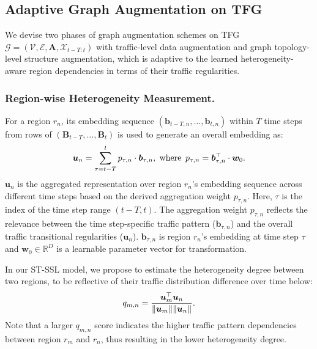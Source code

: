 \documentclass[letterpaper]{article} \usepackage{aaai23}  \usepackage{times}  \usepackage{helvet}  \usepackage{courier}  \usepackage[hyphens]{url}  \usepackage{graphicx} \urlstyle{rm} \def\UrlFont{\rm}  \usepackage{natbib}  \usepackage{caption} \frenchspacing  \setlength{\pdfpagewidth}{8.5in} \setlength{\pdfpageheight}{11in}
\newcommand{\name}{ST-SSL\xspace}
\DeclareMathOperator{\wh}{where}
\begin{document}
\subsection{Adaptive Graph Augmentation on TFG}



We devise two phases of graph augmentation schemes on TFG $\mathcal{G} = \left(\mathcal{V}, \mathcal{E}, \bm A, \mathcal{X}_{t-T:t}\right)$ with traffic-level data augmentation and graph topology-level structure augmentation, which is adaptive to the learned heterogeneity-aware region dependencies in terms of their traffic regularities.

\subsubsection{Region-wise Heterogeneity Measurement.} 
For a region $r_n$, its embedding sequence $(\bm{b}_{t-T, n}, \dots, \bm{b}_{t, n})$ within $T$ time steps from rows of $\left(\bm{B}_{t-T}, \dots, \bm{B}_{t}\right)$ is used to generate an overall embedding as:
\begin{equation}\small\label{eq:ta}
    \bm u_n = \sum_{\tau = t-T}^{t} p_{\tau,n}\cdot \bm b_{\tau,n},~\wh~ p_{\tau,n} = \bm b_{\tau,n}^\top \cdot \bm w_0.
\end{equation}
\noindent $\bm u_n$ is the aggregated representation over region $r_n$'s embedding sequence across different time steps based on the derived aggregation weight $p_{\tau,n}$. Here, $\tau$ is the index of the time step range $(t-T, t)$. The aggregation weight $p_{\tau,n}$ reflects the relevance between the time step-specific traffic pattern ($\bm b_{\tau,n}$) and the overall traffic transitional regularities ($\bm u_n$). $\bm b_{\tau,n}$ is region $r_n$'s embedding at time step $\tau$ and $\bm w_0 \in \mathbb{R}^{D}$ is a learnable parameter vector for transformation.



In our \name model, we propose to estimate the heterogeneity degree between two regions, to be reflective of their traffic distribution difference over time below:
\begin{equation}\label{eq:sa}\small
    q_{m,n} = \frac{\bm{u}_m^{\top} \bm{u}_n}{\Vert \bm{u}_m \Vert \Vert \bm{u}_n \Vert}.
\end{equation}
\noindent Note that a larger $q_{m,n}$ score indicates the higher traffic pattern dependencies between region $r_m$ and $r_n$, thus resulting in the lower heterogeneity degree.
\end{document}

